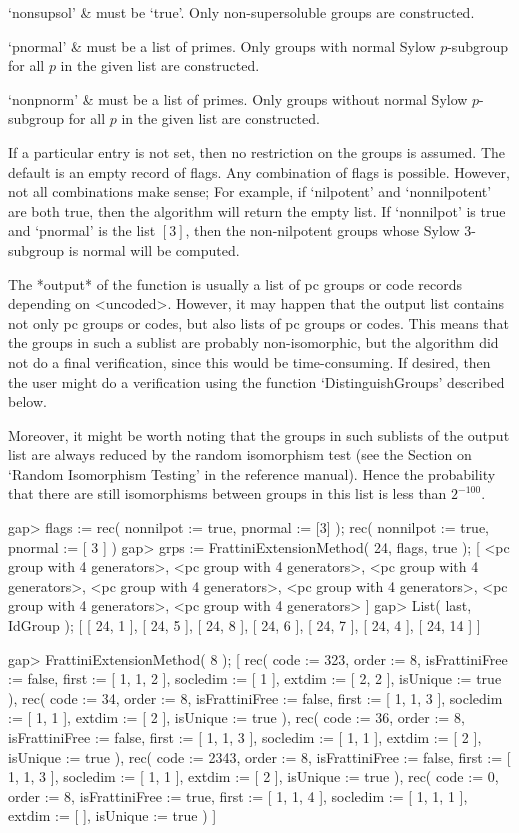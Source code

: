  `nonsupsol' & 
      must be `true'. Only non-supersoluble groups are constructed.

 `pnormal' & 
      must be a list of primes. Only groups with normal Sylow $p$-subgroup
      for all $p$ in the given list are constructed.

 `nonpnorm' & 
      must be a list of primes. Only groups without normal Sylow $p$-subgroup
      for all $p$ in the given list are constructed.
\enditems

If a particular entry is not set, then no restriction on the 
groups is assumed. The default is an empty record of flags. Any
combination of flags is possible. However, not all combinations make
sense; For example, if `nilpotent' and `nonnilpotent' are both true, 
then the algorithm will return the empty list. If `nonnilpot' is
true and `pnormal' is the list $[3]$, then the non-nilpotent groups
whose Sylow 3-subgroup is normal will be computed.

The *output* of the function is usually a list of pc groups or code
records depending on <uncoded>. However, it may happen that the output
list contains not only pc groups or codes, but also lists of pc groups
or codes. This means that the groups in such a sublist are probably
non-isomorphic, but the algorithm did not do a final verification, since 
this would be time-consuming. If desired, then the user might do 
a verification using the function `DistinguishGroups' described
below.

Moreover, it might be worth noting that the groups in such sublists
of the output list are always reduced by the random isomorphism test
(see the Section on `Random Isomorphism Testing' in the reference manual).
Hence the probability that there are still isomorphisms between 
groups in this list is less than $2^{-100}$.

\beginexample
gap> flags := rec( nonnilpot := true, pnormal := [3] );
rec( nonnilpot := true, pnormal := [ 3 ] )
gap> grps := FrattiniExtensionMethod( 24, flags, true );
[ <pc group with 4 generators>, <pc group with 4 generators>, 
  <pc group with 4 generators>, <pc group with 4 generators>, 
  <pc group with 4 generators>, <pc group with 4 generators>, 
  <pc group with 4 generators> ]
gap> List( last, IdGroup );
[ [ 24, 1 ], [ 24, 5 ], [ 24, 8 ], [ 24, 6 ], [ 24, 7 ], [ 24, 4 ], 
  [ 24, 14 ] ]

gap> FrattiniExtensionMethod( 8 );
[ rec( code := 323, order := 8, isFrattiniFree := false, first := [ 1, 1, 2 ],
      socledim := [ 1 ], extdim := [ 2, 2 ], isUnique := true ), 
  rec( code := 34, order := 8, isFrattiniFree := false, first := [ 1, 1, 3 ], 
      socledim := [ 1, 1 ], extdim := [ 2 ], isUnique := true ), 
  rec( code := 36, order := 8, isFrattiniFree := false, first := [ 1, 1, 3 ], 
      socledim := [ 1, 1 ], extdim := [ 2 ], isUnique := true ), 
  rec( code := 2343, order := 8, isFrattiniFree := false, 
      first := [ 1, 1, 3 ], socledim := [ 1, 1 ], extdim := [ 2 ], 
      isUnique := true ), 
  rec( code := 0, order := 8, isFrattiniFree := true, first := [ 1, 1, 4 ], 
      socledim := [ 1, 1, 1 ], extdim := [  ], isUnique := true ) ]
\endexample

